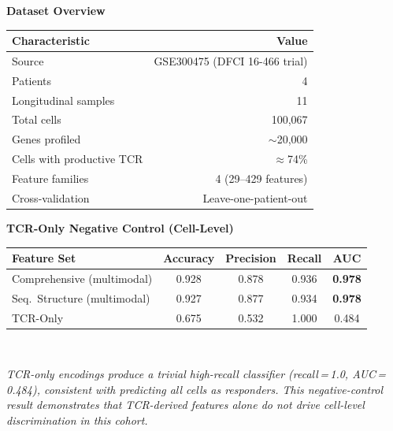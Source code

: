 \documentclass[12pt]{article}
\begin{document}
\clearpage
\thispagestyle{empty}
\vspace*{1cm}
\begin{center}
  {\large\bfseries\textcolor{tealdark}{Dataset Overview}}\\[12pt]
  \begin{tabular}{@{} l r @{}}
    \toprule
    \textbf{Characteristic} & \textbf{Value} \\
    \midrule
    Source & GSE300475 (DFCI 16-466 trial) \\
    Patients & 4 \\
    Longitudinal samples & 11 \\
    Total cells & 100,067 \\
    Genes profiled & $\sim$20,000 \\
    Cells with productive TCR & $\approx$74\% \\
    Feature families & 4 (29--429 features) \\
    Cross-validation & Leave-one-patient-out \\
    \bottomrule
  \end{tabular}
\end{center}

\vspace{2.5cm}

\begin{center}
  {\large\bfseries\textcolor{tealdark}{TCR-Only Negative Control (Cell-Level)}}\\[12pt]
  \begin{tabular}{@{} l c c c c @{}}
    \toprule
    \textbf{Feature Set} & \textbf{Accuracy} & \textbf{Precision} & \textbf{Recall} & \textbf{AUC} \\
    \midrule
    Comprehensive (multimodal) & 0.928 & 0.878 & 0.936 & \textbf{0.978} \\
    Seq.\ Structure (multimodal) & 0.927 & 0.877 & 0.934 & \textbf{0.978} \\
    \rowcolor{warmred!12}
    TCR-Only & 0.675 & 0.532 & 1.000 & 0.484 \\
    \bottomrule
  \end{tabular}\\[8pt]
  \begin{minipage}{0.75\textwidth}
    \small\textit{TCR-only encodings produce a trivial high-recall classifier (recall\,=\,1.0, AUC\,=\,0.484), consistent with predicting all cells as responders. This negative-control result demonstrates that TCR-derived features alone do not drive cell-level discrimination in this cohort.}
  \end{minipage}
\end{center}
\end{document}
